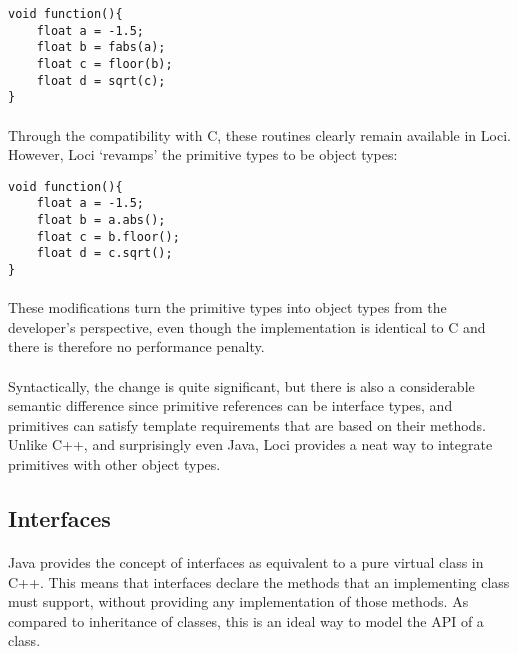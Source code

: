 \documentclass[12pt,twoside,notitlepage]{report}
\begin{document}
\begin{lstlisting}
void function(){
	float a = -1.5;
	float b = fabs(a);
	float c = floor(b);
	float d = sqrt(c);
}
\end{lstlisting}


\paragraph{}
Through the compatibility with C, these routines clearly remain available in Loci. However, Loci `revamps' the primitive types to be object types:


\begin{lstlisting}
void function(){
	float a = -1.5;
	float b = a.abs();
	float c = b.floor();
	float d = c.sqrt();
}
\end{lstlisting}


\paragraph{}
These modifications turn the primitive types into object types from the developer's perspective, even though the implementation is identical to C and there is therefore no performance penalty.

\paragraph{}
Syntactically, the change is quite significant, but there is also a considerable semantic difference since primitive references can be interface types, and primitives can satisfy template requirements that are based on their methods. Unlike C++, and surprisingly even Java, Loci provides a neat way to integrate primitives with other object types.

\clearpage

\subsection{Interfaces}

\paragraph{}
Java provides the concept of interfaces as equivalent to a pure virtual class in C++. This means that interfaces declare the methods that an implementing class must support, without providing any implementation of those methods. As compared to inheritance of classes, this is an ideal way to model the API of a class.
\end{document}
